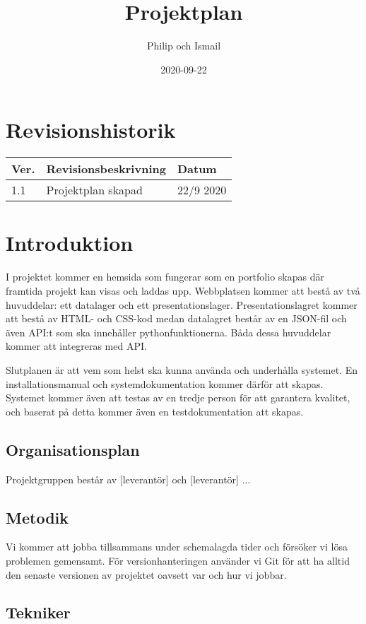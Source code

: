 \documentclass{TDP003mall}
\author{Philip och Ismail}
\title{Projektplan}
\date{2020-09-22}
\begin{document}
\projectpage

\tableofcontents

\newpage

\section{Revisionshistorik}
\begin{table}[!h]
\begin{tabularx}{\linewidth}{|l|X|l|}
\hline
Ver. & Revisionsbeskrivning & Datum \\\hline
1.1 & Projektplan skapad & 22/9 2020 \\\hline
\end{tabularx}
\end{table}


\section{Introduktion}
I projektet kommer en hemsida som fungerar som en portfolio skapas där framtida projekt kan visas och laddas upp. Webbplatsen kommer att bestå av två huvuddelar: ett datalager och ett presentationslager. Presentationslagret kommer att bestå av HTML- och CSS-kod medan datalagret består av en JSON-fil och även API:t som ska innehåller pythonfunktionerna. Båda dessa huvuddelar kommer att integreras med API.

Slutplanen är att vem som helst ska kunna använda och underhålla systemet. En installationsmanual och systemdokumentation kommer därför att skapas. Systemet kommer även att testas av en tredje person för att garantera kvalitet, och baserat på detta kommer även en testdokumentation att skapas.

\subsection{Organisationsplan}

Projektgruppen består av [leverantör] och [leverantör] ...

\subsection{Metodik}

Vi kommer att jobba tillsammans under schemalagda tider och försöker vi lösa problemen gemensamt. För versionhanteringen använder vi Git för att ha alltid den senaste versionen av projektet oavsett var och hur vi jobbar.

\subsection{Tekniker}
\end{document}
